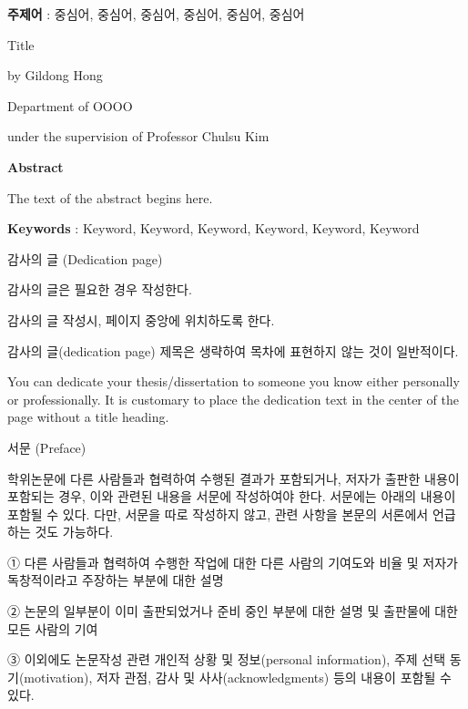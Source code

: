 \documentclass[11pt]{report}
\numberwithin{figure}{section}
\theoremstyle{plain}
\theoremstyle{definition}
\theoremstyle{corollary}
\theoremstyle{definition}
\theoremstyle{plain}
\theoremstyle{definition}
\theoremstyle{plain}
\begin{document}
\textbf{주제어} : 중심어, 중심어, 중심어, 중심어, 중심어, 중심어


\newpage
\begin{center}
\Large Title

\par\vspace{20pt}

\normalsize by Gildong Hong\par
Department of OOOO\par
under the supervision of Professor Chulsu Kim

\par\vspace{20pt}

\Large \textbf{Abstract}
\end{center}
\normalsize
The text of the abstract begins here. 

\par\vspace{100pt}

\textbf{Keywords} : Keyword, Keyword, Keyword, Keyword, Keyword, Keyword

\newpage
\begin{center}
\large
감사의 글 (Dedication page)
\end{center}
\normalsize
감사의 글은 필요한 경우 작성한다.

감사의 글 작성시, 페이지 중앙에 위치하도록 한다. 

감사의 글(dedication page) 제목은 생략하여 목차에 표현하지 않는 것이 일반적이다.

You can dedicate your thesis/dissertation to someone you know either personally or professionally.
It is customary to place the dedication text in the center of the page without a title heading.

\newpage
\begin{center}
\large
서문 (Preface)
\end{center}
\normalsize
학위논문에 다른 사람들과 협력하여 수행된 결과가 포함되거나, 저자가 출판한 내용이 포함되는 경우, 이와 관련된 내용을 서문에 작성하여야 한다.
서문에는 아래의 내용이 포함될 수 있다.
다만, 서문을 따로 작성하지 않고, 관련 사항을 본문의 서론에서 언급하는 것도 가능하다. 

① 다른 사람들과 협력하여 수행한 작업에 대한 다른 사람의 기여도와 비율 및 저자가 독창적이라고 주장하는 부분에 대한 설명

② 논문의 일부분이 이미 출판되었거나 준비 중인 부분에 대한 설명 및 출판물에 대한 모든 사람의 기여

③ 이외에도 논문작성 관련 개인적 상황 및 정보(personal information), 주제 선택 동기(motivation), 저자 관점, 감사 및 사사(acknowledgments) 등의 내용이 포함될 수 있다.
\end{document}
